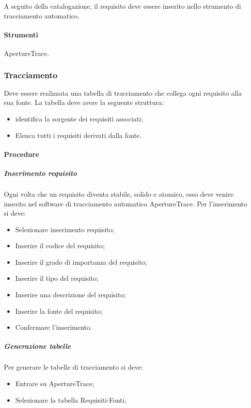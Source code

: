 A seguito della catalogazione, il requisito deve essere inserito nello strumento di tracciamento automatico.


\paragraph{Strumenti}
ApertureTrace.

\subsubsection{Tracciamento}

Deve essere realizzata una tabella di tracciamento che collega ogni requisito alla sua fonte.
La tabella deve avere la seguente struttura:

\begin{itemize}
\item {} identifica la sorgente dei requisiti associati;
\item {} Elenca tutti i requisiti derivati dalla fonte.
\end{itemize}


\paragraph{Procedure}
\subparagraph{Inserimento requisito}
Ogni volta che un requisito diventa stabile, solido e atomico, esso deve venire inserito nel software di tracciamento automatico ApertureTrace. 
Per l'inserimento si deve:
\begin{itemize}
\item Selezionare inserimento requisito;
\item Inserire il codice del requisito;
\item Inserire il grado di importanza del requisito;
\item Inserire il tipo del requisito;
\item Inserire una descrizione del requisito;
\item Inserire la fonte del requisito;
\item Confermare l'inserimento.
\end{itemize}

\subparagraph{Generazione tabelle}
Per generare le tabelle di tracciamento si deve:

\begin{itemize}
\item Entrare su ApertureTrace;
\item Selezionare la tabella Requisiti-Fonti;

\end{itemize}


